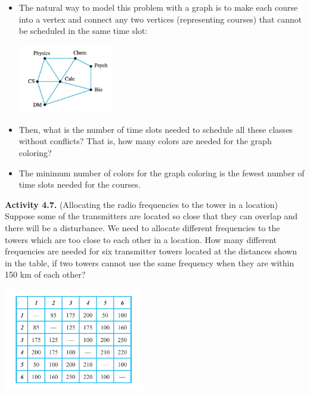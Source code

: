 \documentclass[aspectratio=169]{beamer}
\begin{document}
\begin{frame}[plain]{}

 \begin{itemize}
  \item The natural way to model this problem with a graph is to make each course into
     a vertex and connect any two vertices (representing courses) that cannot be scheduled 
     in the same time slot: \pause 
      \begin{center}
         \includegraphics[height=3cm]{./img/lecture4-fig7.png}
       \end{center}\pause 
    \item Then,  what is the  number of time slots needed to schedule all these classes without conflicts? 
     That is, how many colors are needed for the graph coloring?
    \item  The minimum number of colors for the graph coloring is the fewest number of time slots needed for the courses. 
 \end{itemize} 
\end{frame}


\begin{frame}[plain]{}
 
 
 {\bf Activity 4.7.} (Allocating the radio frequencies to the tower in a location)
  Suppose some of the transmitters are
  located so close  that they can overlap and there will be a disturbance.
 We need to allocate different frequencies to the
towers which are too close to each other in a location.
   How many different frequencies are needed for six transmitter towers
    located at the distances 
  shown in the table, if two towers cannot use the same frequency 
  when they are within 150 km of each other?
  
  \begin{center}
         \includegraphics[height=4.5cm]{./img/lecture4-fig8.png}
       \end{center}

\end{frame}



\end{document}

